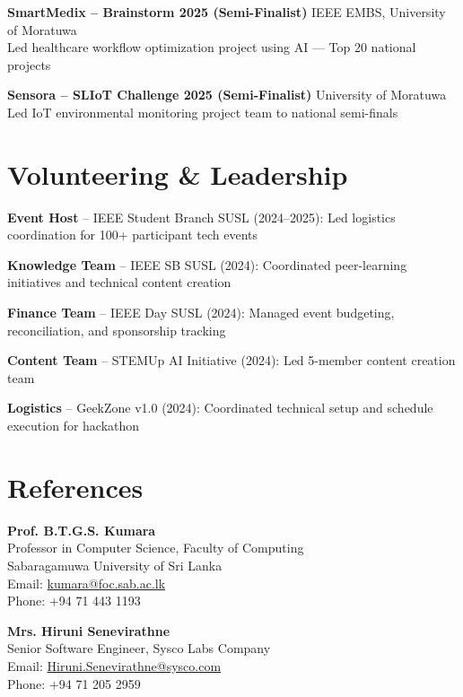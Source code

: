 \documentclass[letterpaper,10.8pt]{article}
\newenvironment{resume_list}{
  \vspace{-1pt}
  \begin{itemize}[itemsep=2pt, leftmargin=14pt]
}{
  \end{itemize}\vspace{-2pt}
}
\begin{document}
\noindent\textbf{SmartMedix – Brainstorm 2025 (Semi-Finalist)} \hfill IEEE EMBS, University of Moratuwa\\
Led healthcare workflow optimization project using AI — Top 20 national projects

\vspace{5pt}
\noindent\textbf{Sensora – SLIoT Challenge 2025 (Semi-Finalist)} \hfill University of Moratuwa\\
Led IoT environmental monitoring project team to national semi-finals

\section{Volunteering \& Leadership}
\vspace{-1pt}
\begin{resume_list}
  \item \textbf{Event Host} – IEEE Student Branch SUSL (2024–2025): Led logistics coordination for 100+ participant tech events
  \vspace{3pt}
  \item \textbf{Knowledge Team} – IEEE SB SUSL (2024): Coordinated peer-learning initiatives and technical content creation
  \vspace{3pt}
  \item \textbf{Finance Team} – IEEE Day SUSL (2024): Managed event budgeting, reconciliation, and sponsorship tracking
  \vspace{3pt}
  \item \textbf{Content Team} – STEMUp AI Initiative (2024): Led 5-member content creation team
  \vspace{3pt}
  \item \textbf{Logistics} – GeekZone v1.0 (2024): Coordinated technical setup and schedule execution for hackathon
\end{resume_list}

\vspace{-2pt}
\section{References}
\vspace{-1pt}

\noindent\textbf{Prof. B.T.G.S. Kumara}\\
Professor in Computer Science, Faculty of Computing\\
Sabaragamuwa University of Sri Lanka\\
Email: \href{mailto:kumara@foc.sab.ac.lk}{kumara@foc.sab.ac.lk}\\
Phone: +94 71 443 1193

\vspace{6pt}

\noindent\textbf{Mrs. Hiruni Senevirathne}\\
Senior Software Engineer, Sysco Labs Company\\
Email: \href{mailto:Hiruni.Senevirathne@sysco.com}{Hiruni.Senevirathne@sysco.com}\\
Phone: +94 71 205 2959
\end{document}
